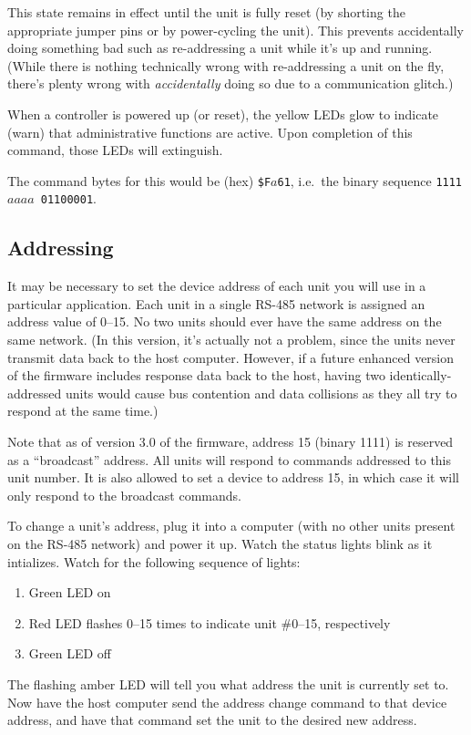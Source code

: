 \documentclass[12pt]{article}
\begin{document}
This state remains in effect
until the unit is fully reset (by shorting the appropriate jumper pins or
by power-cycling the unit).  This prevents accidentally doing something 
bad such as re-addressing a unit while it's up and running.  (While there
is nothing technically wrong with re-addressing a unit on the fly, there's
plenty wrong with \emph{accidentally} doing so due to a communication 
glitch.)

When a controller is powered up (or reset), the yellow LEDs glow to indicate
(warn) that administrative functions are active.  Upon completion of this
command, those LEDs will extinguish.

The command bytes for this would be (hex) {\tt\$F$a$61},
i.e.\ the binary sequence {\tt 1111$aaaa$ 01100001}.


\subsection{Addressing}
It may be necessary to set the device address of each unit you will use
in a particular application.  Each unit in a single RS-485 network is
assigned an address value of 0--15.  No two units should ever have the
same address on the same network.  (In this version, it's actually not 
a problem, since the units never transmit data back to the host computer.
However, if a future enhanced version of the firmware includes response
data back to the host, having two identically-addressed units would cause
bus contention and data collisions as they all try to respond at the same
time.)

Note that as of version 3.0 of the firmware, address 15 (binary 1111) is
reserved as a ``broadcast'' address.  All units will respond to commands
addressed to this unit number.  It is also allowed to set a device to address
15, in which case it will only respond to the broadcast commands.

To change a unit's address, plug it into a computer (with no other units 
present on the RS-485 network) and power it up.  Watch the status lights 
blink as it intializes.  Watch for the following sequence of lights:
\begin{enumerate}
 \item Green LED on
 \item Red LED flashes 0--15 times to indicate unit \#0--15, respectively
 \item Green LED off
\end{enumerate}

The flashing amber LED will tell you what address the unit is currently
set to.  Now have the host computer send the address change command to
that device address, and have that command set the unit to the desired
new address.
\end{document}
